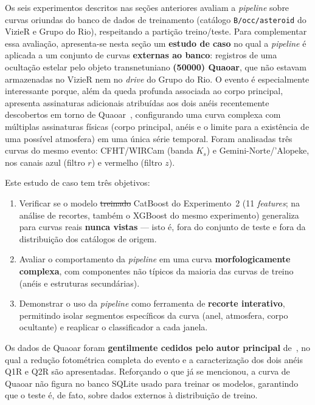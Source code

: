 \documentclass[msc]{on} %
\makeatletter
\providecommand{\DIFaddtex}[1]{{\protect\color{red}#1}} %
\providecommand{\DIFdeltex}[1]{{\protect\color{red}\sout{#1}}} %
\providecommand{\DIFaddbegin}{} %
\providecommand{\DIFaddend}{} %
\providecommand{\DIFdelbegin}{} %
\providecommand{\DIFdelend}{} %
\providecommand{\DIFadd}[1]{\texorpdfstring{\DIFaddtex{#1}}{#1}} %
\providecommand{\DIFdel}[1]{\texorpdfstring{\DIFdeltex{#1}}{}} %
\let\sout@orig\sout %
\renewcommand{\sout}[1]{\ifmmode\text{\sout@orig{\ensuremath{#1}}}\else\sout@orig{#1}\fi} %
\makeatother
\begin{document}
Os seis experimentos descritos nas seções anteriores avaliam a \textit{pipeline} sobre curvas oriundas do banco de dados de treinamento (catálogo \texttt{B/occ/asteroid} do VizieR e Grupo do Rio), respeitando a partição treino/teste. Para complementar essa avaliação, apresenta-se nesta seção um \textbf{estudo de caso} no qual a \textit{pipeline} é aplicada a um conjunto de curvas \textbf{externas ao banco}: registros de uma ocultação estelar pelo objeto transnetuniano \textbf{(50000) Quaoar}, que não estavam armazenadas no VizieR nem no \textit{drive} do Grupo do Rio. O evento é especialmente interessante porque, além da queda profunda associada ao corpo principal, apresenta assinaturas adicionais atribuídas aos dois anéis recentemente descobertos em torno de Quaoar~\citep{Quaoar2023, Morgado2023}, configurando uma curva complexa com múltiplas assinaturas físicas (corpo principal, anéis e o limite para a existência de uma possível atmosfera) em uma única série temporal. \DIFaddbegin \DIFadd{Foram analisadas três curvas do mesmo evento: CFHT/WIRCam (banda $K_s$) e Gemini-Norte/'Alopeke, nos canais azul (filtro $r$) e vermelho (filtro $z$).
}\DIFaddend 

Este estudo de caso tem três objetivos:
\begin{enumerate}
	\item Verificar se o modelo \DIFdelbegin \DIFdel{treinado }\DIFdelend \DIFaddbegin \DIFadd{CatBoost do Experimento~2 (11 }\textit{\DIFadd{features}}\DIFadd{; na análise de recortes, também o XGBoost do mesmo experimento) }\DIFaddend generaliza para curvas reais \textbf{nunca vistas} --- isto é, fora do conjunto de teste e fora da distribuição dos catálogos de origem.
	\item Avaliar o comportamento da \textit{pipeline} em uma curva \textbf{morfologicamente complexa}, com componentes não típicos da maioria das curvas de treino (anéis e estruturas secundárias).
	\item Demonstrar o uso da \textit{pipeline} como ferramenta de \textbf{recorte interativo}, permitindo isolar segmentos específicos da curva (anel, atmosfera, corpo ocultante) e reaplicar o classificador a cada janela.
\end{enumerate}

Os dados de Quaoar foram \textbf{gentilmente cedidos pelo autor principal} de~\citet{Quaoar2023}, no qual a redução fotométrica completa do evento e a caracterização dos dois anéis Q1R e Q2R são apresentadas. Reforçando o que já se mencionou, a curva de Quaoar não figura no banco SQLite usado para treinar os modelos, garantindo que o teste é, de fato, sobre dados externos à distribuição de treino.
\end{document}
